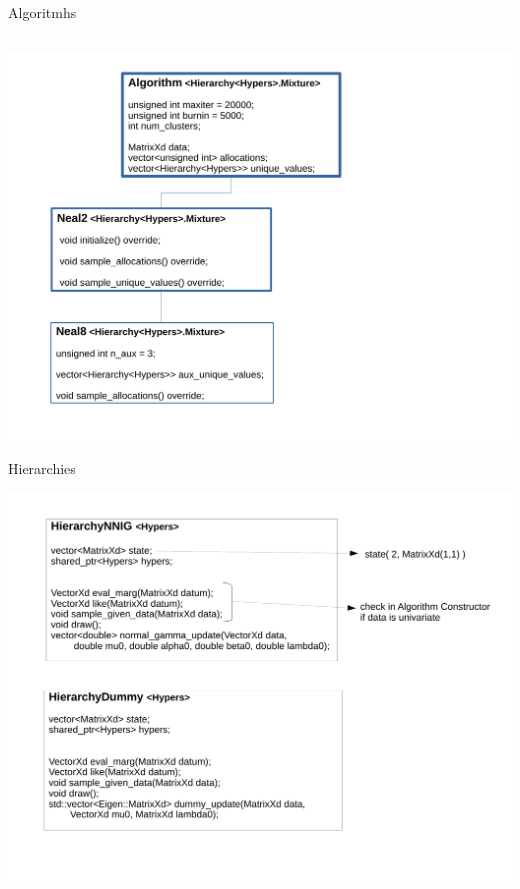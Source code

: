 

\begin{frame}[fragile]{Algoritmhs}
\begin{verbatim}

\end{verbatim}
	\begin{center}
		\includegraphics[scale=0.35]{etc/algo.pdf}
	\end{center}
\end{frame}

\begin{frame}{Hierarchies}
	\begin{center}
		\includegraphics[scale=0.35]{etc/hierarchy.pdf}
	\end{center}

\end{frame}

